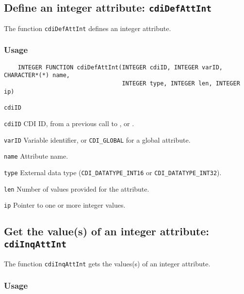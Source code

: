 \subsection{Define an integer attribute: \texttt{cdiDefAttInt}}
\label{cdiDefAttInt}

The function {\texttt{cdiDefAttInt}} defines an integer attribute.

\subsubsection*{Usage}

\begin{verbatim}
    INTEGER FUNCTION cdiDefAttInt(INTEGER cdiID, INTEGER varID, CHARACTER*(*) name, 
                                  INTEGER type, INTEGER len, INTEGER ip)
\end{verbatim}

\hspace*{4mm}\begin{minipage}[]{15cm}
\begin{deflist}{\texttt{cdiID}\ }
\item[\texttt{cdiID}]
CDI ID, from a previous call to {}, {} or {}.
\item[\texttt{varID}]
Variable identifier, or {\texttt{CDI\_GLOBAL}} for a global attribute.
\item[\texttt{name}]
Attribute name.
\item[\texttt{type}]
External data type ({\texttt{CDI\_DATATYPE\_INT16}} or {\texttt{CDI\_DATATYPE\_INT32}}).
\item[\texttt{len}]
Number of values provided for the attribute.
\item[\texttt{ip}]
Pointer to one or more integer values.

\end{deflist}
\end{minipage}


\subsection{Get the value(s) of an integer attribute: \texttt{cdiInqAttInt}}
\label{cdiInqAttInt}

The function {\texttt{cdiInqAttInt}} gets the values(s) of an integer attribute.

\subsubsection*{Usage}

